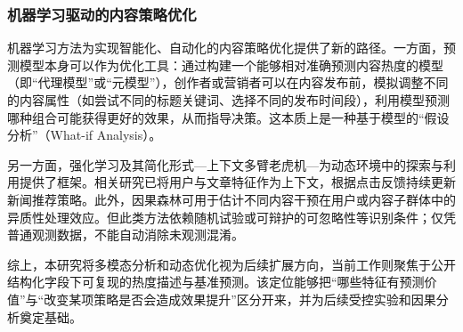 \subsubsection{机器学习驱动的内容策略优化}
机器学习方法为实现智能化、自动化的内容策略优化提供了新的路径。一方面，预测模型本身可以作为优化工具：通过构建一个能够相对准确预测内容热度的模型（即“代理模型”或“元模型”），创作者或营销者可以在内容发布前，模拟调整不同的内容属性（如尝试不同的标题关键词、选择不同的发布时间段），利用模型预测哪种组合可能获得更好的效果，从而指导决策。这本质上是一种基于模型的“假设分析”（What-if Analysis）。

另一方面，强化学习及其简化形式---上下文多臂老虎机---为动态环境中的探索与利用提供了框架。相关研究已将用户与文章特征作为上下文，根据点击反馈持续更新新闻推荐策略\cite{LiEtAl2010}。此外，因果森林可用于估计不同内容干预在用户或内容子群体中的异质性处理效应\cite{WagerAthey2018}。但此类方法依赖随机试验或可辩护的可忽略性等识别条件；仅凭普通观测数据，不能自动消除未观测混淆。

综上，本研究将多模态分析和动态优化视为后续扩展方向，当前工作则聚焦于公开结构化字段下可复现的热度描述与基准预测。该定位能够把“哪些特征有预测价值”与“改变某项策略是否会造成效果提升”区分开来，并为后续受控实验和因果分析奠定基础。
